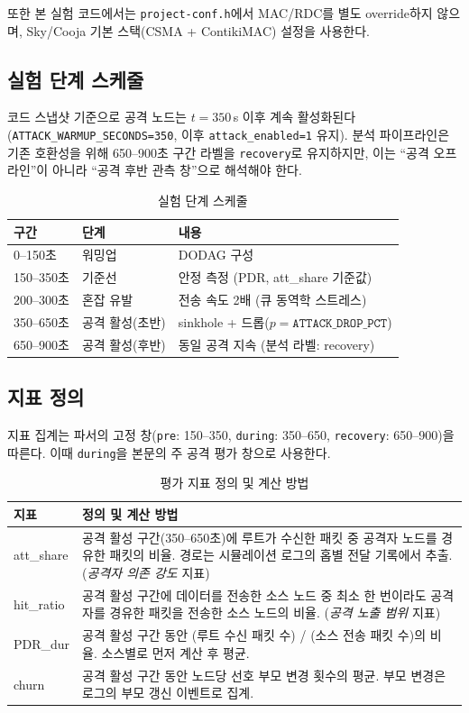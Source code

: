 \documentclass[12pt,a4paper]{article}
\begin{document}
또한 본 실험 코드에서는 \texttt{project-conf.h}에서 MAC/RDC를 별도 override하지 않으며,
Sky/Cooja 기본 스택(CSMA + ContikiMAC) 설정을 사용한다.

\subsection{실험 단계 스케줄}

코드 스냅샷 기준으로 공격 노드는 $t=350$\,s 이후 계속 활성화된다
(\texttt{ATTACK\_WARMUP\_SECONDS=350}, 이후 \texttt{attack\_enabled=1} 유지).
분석 파이프라인은 기존 호환성을 위해 650--900초 구간 라벨을
\texttt{recovery}로 유지하지만, 이는 ``공격 오프라인''이 아니라
``공격 후반 관측 창''으로 해석해야 한다.

\begin{table}[htbp]
\centering
\caption{실험 단계 스케줄}
\label{tab:schedule}
\begin{tabular}{lll}
\toprule
구간 & 단계 & 내용 \\
\midrule
0--150초   & 워밍업    & DODAG 구성 \\
150--350초 & 기준선    & 안정 측정 (PDR, att\_share 기준값) \\
200--300초 & 혼잡 유발 & 전송 속도 2배 (큐 동역학 스트레스) \\
350--650초 & 공격 활성(초반) & sinkhole + 드롭($p=\texttt{ATTACK\_DROP\_PCT}$) \\
650--900초 & 공격 활성(후반) & 동일 공격 지속 (분석 라벨: recovery) \\
\bottomrule
\end{tabular}
\end{table}

\subsection{지표 정의}
\label{app:metrics}

지표 집계는 파서의 고정 창(\texttt{pre}: 150--350, \texttt{during}: 350--650,
\texttt{recovery}: 650--900)을 따른다.
이때 \texttt{during}을 본문의 주 공격 평가 창으로 사용한다.

\begin{table}[htbp]
\centering
\caption{평가 지표 정의 및 계산 방법}
\label{tab:metrics}
\begin{tabularx}{\linewidth}{lX}
\toprule
지표 & 정의 및 계산 방법 \\
\midrule
att\_share
  & 공격 활성 구간(350--650초)에 루트가 수신한 패킷 중
    공격자 노드를 경유한 패킷의 비율.
    경로는 시뮬레이션 로그의 홉별 전달 기록에서 추출.
    (\emph{공격자 의존 강도} 지표) \\[4pt]
hit\_ratio
  & 공격 활성 구간에 데이터를 전송한 소스 노드 중
    최소 한 번이라도 공격자를 경유한 패킷을 전송한
    소스 노드의 비율.
    (\emph{공격 노출 범위} 지표) \\[4pt]
PDR\_dur
  & 공격 활성 구간 동안
    (루트 수신 패킷 수) / (소스 전송 패킷 수)의 비율.
    소스별로 먼저 계산 후 평균. \\[4pt]
churn
  & 공격 활성 구간 동안 노드당 선호 부모 변경 횟수의 평균.
    부모 변경은 로그의 부모 갱신 이벤트로 집계. \\
\bottomrule
\end{tabularx}
\end{table}
\end{document}
